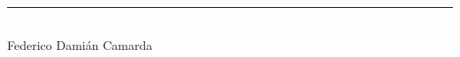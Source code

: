 \newpage
\thispagestyle{empty}

\

\

\

\

\

\

\

\

\

\

\

\

\

\begin{center}
\rule{7cm}{0.5pt}\\
Federico Damián Camarda
\end{center}
